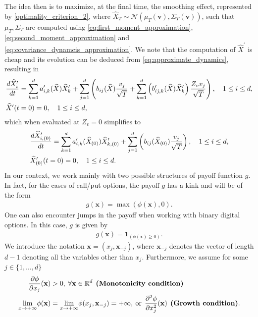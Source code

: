 The idea then is to maximize, at the final time, the smoothing effect, represented by \eqref{optimality_criterion_2}, where $\hat{X}_T \sim \mathcal{N}(\mu_T(\mathbf{v}), \Sigma_T(\mathbf{v}))$, such that $\mu_T, \Sigma_T$ are computed using   \eqref{eq:first_moment_approximation}, \eqref{eq:second_moment_approximation} and \eqref{eq:covariance_dynamcis_approximation}. We note that the computation of $\hat{X}^\prime$ is cheap and its evolution can be deduced from \eqref{eq:approximate_dynamics}, resulting in
\begin{align*}
&\frac{d\widehat{X}^\prime_i}{dt}=\sum_{k=1}^d a^\prime_{i,k}(\widehat{X}) \widehat{X}^\prime_k+\sum_{j=1}^d  \left(b_{ij}(\widehat{X})\frac{ v_j}{\sqrt{T}}+ \sum_{k=1}^d \left(b^\prime_{ij,k}(\widehat{X}) \widehat{X}^\prime_k \right) \frac{Z_v v_j}{\sqrt{T}}\right), \quad  1 \le i \le d , \nonumber\\
&\widehat{X}^\prime(t=0)=0, \quad  1 \le i \le d ,
\end{align*}
which when evaluated at $Z_v=0$ simplifies to
\begin{align*}
&\frac{d\widehat{X}^\prime_{i,(0)}}{dt}=\sum_{k=1}^d a^\prime_{i,k}(\widehat{X}_{(0)}) \widehat{X}^\prime_{k,(0)}+\sum_{j=1}^d  \left(b_{ij}(\widehat{X}_{(0)})\frac{ v_j}{\sqrt{T}}\right), \quad  1 \le i \le d , \nonumber\\
&\widehat{X}_{(0)}^\prime(t=0)=0, \quad  1 \le i \le d .
\end{align*}
In our context, we work mainly with two possible structures of payoff function $g$. In fact, for the cases of call/put options, the payoff $g$ has a kink and  will be of the form 
\begin{align}\label{eq:call_option}
g(\mathbf{x})=\max(\phi(\mathbf{x}),0).
\end{align}
One can also encounter jumps in the payoff when working with binary digital options. In this case, $g$ is given by 
\begin{align}\label{eq:binary_option}
	g(\mathbf{x})=\mathbf{1}_{(\phi(\mathbf{x}) \ge 0)}.
\end{align}
We introduce the notation $\mathbf{x}=(x_j,\mathbf{x}_{-j})$, where $\mathbf{x}_{-j}$ denotes the vector of length $d-1$ denoting all the variables other than $x_j$. Furthermore, we assume for some $j \in \{1,\dots,d\}$
\begin{align}
	\frac{\partial \phi}{\partial x_j}(\mathbf{x}) &>0,\: \forall \mathbf{x} \in \mathbb{R}^d \: \: \textbf{(Monotonicity condition)}  \label{assump:Monotonicity condition}\\
	\underset{x \rightarrow +\infty}{\lim} \phi(\mathbf{x})&=\underset{x \rightarrow +\infty}{\lim} \phi(x_j,\mathbf{x}_{-j})=+\infty, \: \text{or} \:\: \frac{\partial^2 \phi} {\partial x_j^2}(\mathbf{x}) \: \: \textbf{(Growth condition)}  \label{assump:Growth condition} .
\end{align}
